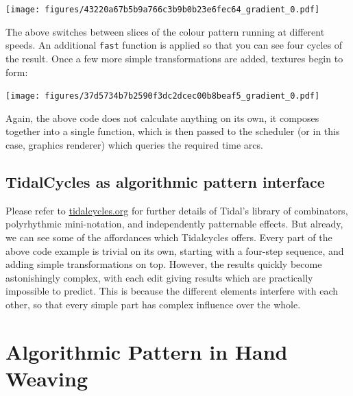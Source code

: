 \documentclass{nime-alternate} %
\newenvironment{Shaded}{\begin{snugshade}}{\end{snugshade}}
\newcommand{\DecValTok}[1]{\textcolor[rgb]{0.00,0.00,0.81}{#1}}
\newcommand{\FloatTok}[1]{\textcolor[rgb]{0.00,0.00,0.81}{#1}}
\newcommand{\NormalTok}[1]{#1}
\newcommand{\OperatorTok}[1]{\textcolor[rgb]{0.81,0.36,0.00}{\textbf{#1}}}
\newcommand{\StringTok}[1]{\textcolor[rgb]{0.31,0.60,0.02}{#1}}
\begin{document}
\texttt{[image: figures/43220a67b5b9a766c3b9b0b23e6fec64\_gradient\_0.pdf]}

The above switches between slices of the colour pattern running at
different speeds. An additional \texttt{fast} function is applied so
that you can see four cycles of the result. Once a few more simple
transformations are added, textures begin to form:

\begin{Shaded}
\end{Shaded}

\texttt{[image: figures/37d5734b7b2590f3dc2dcec00b8beaf5\_gradient\_0.pdf]}

Again, the above code does not calculate anything on its own, it
composes together into a single function, which is then passed to the
scheduler (or in this case, graphics renderer) which queries the
required time arcs.

\hypertarget{tidalcycles-as-algorithmic-pattern-interface}{%
\subsection{TidalCycles as algorithmic pattern
interface}\label{tidalcycles-as-algorithmic-pattern-interface}}

Please refer to \href{https://tidalcycles.org}{tidalcycles.org} for
further details of Tidal's library of combinators, polyrhythmic
mini-notation, and independently patternable effects. But already, we
can see some of the affordances which Tidalcycles offers. Every part of
the above code example is trivial on its own, starting with a four-step
sequence, and adding simple transformations on top. However, the results
quickly become astonishingly complex, with each edit giving results
which are practically impossible to predict. This is because the
different elements interfere with each other, so that every simple part
has complex influence over the whole.

\hypertarget{algorithmic-pattern-in-hand-weaving}{%
\section{Algorithmic Pattern in Hand
Weaving}\label{algorithmic-pattern-in-hand-weaving}}
\end{document}

